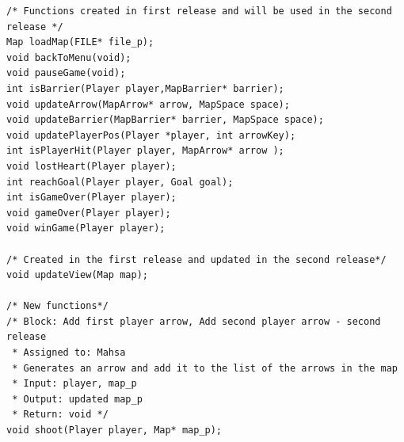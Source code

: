 \begin{verbatim}
/* Functions created in first release and will be used in the second release */
Map loadMap(FILE* file_p);
void backToMenu(void);
void pauseGame(void);
int isBarrier(Player player,MapBarrier* barrier);
void updateArrow(MapArrow* arrow, MapSpace space);
void updateBarrier(MapBarrier* barrier, MapSpace space);
void updatePlayerPos(Player *player, int arrowKey);
int isPlayerHit(Player player, MapArrow* arrow );
void lostHeart(Player player);
int reachGoal(Player player, Goal goal);
int isGameOver(Player player);
void gameOver(Player player);
void winGame(Player player);

/* Created in the first release and updated in the second release*/
void updateView(Map map);

/* New functions*/
/* Block: Add first player arrow, Add second player arrow - second release
 * Assigned to: Mahsa
 * Generates an arrow and add it to the list of the arrows in the map
 * Input: player, map_p
 * Output: updated map_p
 * Return: void */
void shoot(Player player, Map* map_p);
\end{verbatim}
